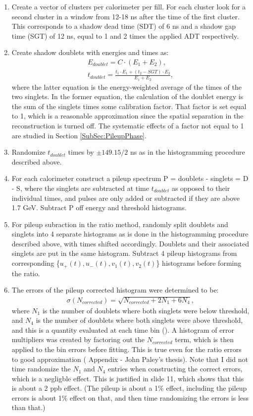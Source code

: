 	\begin{enumerate}
		\item{Create a vector of clusters per calorimeter per fill. For each cluster look for a second cluster in a window from 12-18 ns after the time of the first cluster. This corresponds to a shadow dead time (SDT) of 6 ns and a shadow gap time (SGT) of 12 ns, equal to 1 and 2 times the applied ADT respectively.}
		\item{Create shadow doublets with energies and times as:
			\begin{gather}
				E_{doublet} = C \cdot (E_{1} + E_{2}), \\
				t_{doublet} = \frac{t_{1} \cdot E_{1} + (t_{2}-SGT) \cdot E_{2}}{E_{1} + E_{2}},
			\end{gather}
		where the latter equation is the energy-weighted average of the times of the two singlets. In the former equation, the calculation of the doublet energy is the sum of the singlets times some calibration factor. That factor is set equal to 1, which is a reasonable approximation since the spatial separation in the reconstruction is turned off. The systematic effects of a factor not equal to 1 are studied in Section \ref{SubSec:PileupPhase}.}
		\item{Randomize $t_{doublet}$ times by $\pm 149.15/2$ ns as in the histogramming procedure described above.}
		\item{For each calorimeter construct a pileup spectrum P = doublets - singlets = D - S, where the singlets are subtracted at time $t_{doublet}$ as opposed to their individual times, and pulses are only added or subtracted if they are above 1.7 GeV. Subtract P off energy and threshold histograms.}
		\item{For pileup subraction in the ratio method, randomly split doublets and singlets into 4 separate histograms as is done in the histogramming procedure described above, with times shifted accordingly. Doublets and their associated singlets are put in the same histogram. Subtract 4 pileup histograms from corresponding \{$u_{+}(t), u_{-}(t), v_{1}(t), v_{2}(t)$\} histograms before forming the ratio.}
		\item{The errors of the pileup corrected histogram were determined to be: 
			\begin{gather}
				\sigma(N_{corrected}) = \sqrt{N_{corrected} + 2 N_{1} + 6 N_{4}},
			\end{gather}
		where $N_{1}$ is the number of doublets where both singlets were below threshold, and $N_{4}$ is the number of doublets where both singlets were above threshold, and this is a quantity evaluated at each time bin (). A histogram of error multipliers was created by factoring out the $N_{corrected}$ term, which is then applied to the bin errors before fitting. This is true even for the ratio errors to good approximation ( Appendix - John Paley's thesis). Note that I did not time randomize the $N_{1}$ and $N_{4}$ entries when constructing the correct errors, which is a negligble effect. This is justified in  slide 11, which shows that this is about a 2 ppb effect. (The pileup is about a 1\% effect, including the pileup errors is about 1\% effect on that, and then time randomizing the errors is less than that.)}

\end{enumerate}
